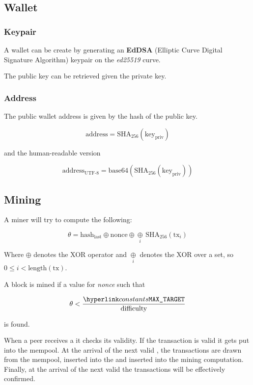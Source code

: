 \documentclass[../documentation.tex]{subfiles}
\begin{document}
\pagebreak

\subsection{Wallet}

\subsubsection{Keypair}

A wallet can be create by generating an \textbf{EdDSA}
(Elliptic Curve Digital Signature Algorithm) keypair
on the \textit{ed25519} curve.

The public key can be retrieved given the private key.

\subsubsection{Address}

The public wallet address is given by the hash of the public key.

\[
    \text{address}=\text{SHA}_{256}(\text{key}_\text{priv})
\]

and the human-readable version

\[
    \text{address}_\text{UTF-8}=\text{base64}(\text{SHA}_{256}(\text{key}_\text{priv}))
\]

\subsection{Mining}

A miner will try to compute the following:

\[
    \theta =
    \text{hash}_\text{last}
    \oplus
    \text{nonce}
    \oplus
    \underset{i}{\oplus}\,
    \text{SHA}_{256}(\text{tx}_i)
\]

Where \(\oplus\) denotes the XOR operator and 
\(\underset{i}{\oplus}\) denotes the XOR over a set,
so \(0 \leq i < \text{length}(\text{tx})\).

A block is mined if a value for \textit{nonce} such that

\[
    \theta < \frac{\const{MAX\_TARGET}}{\text{difficulty}}
\]

is found.

When a peer receives a  it checks its validity.
If the transaction is valid it gets put into the mempool.
At the arrival of the next valid , the transactions
are drawn from the mempool, inserted into the and inserted into the mining computation.
Finally, at the arrival of the next valid 
the transactions will be effectively confirmed.
\end{document}
